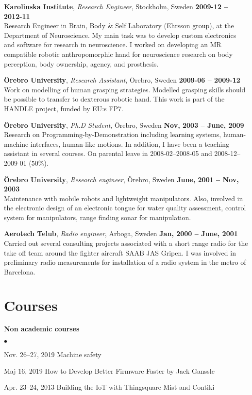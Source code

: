 \documentclass[a4paper,margin,line]{res} \usepackage{latexsym}
\newenvironment{list2}{
  \begin{list}{$\bullet$}{%
      \setlength{\itemsep}{0in} \setlength{\parsep}{0in}
      \setlength{\parskip}{0in} \setlength{\topsep}{0in}
      \setlength{\partopsep}{0in}
      \setlength{\leftmargin}{0.2in}}}{\end{list}}
\begin{document}
\begin{resume}

{\bf Karolinska Institute}, {\em Research Engineer}, Stockholm, Sweden
\hfill {\bf 2009-12 -- 2012-11}\\ Research Engineer in Brain, Body \&
Self Laboratory (Ehrsson group), at the Department of Neuroscience.
My main task was to develop custom electronics and software for
research in neuroscience.  I worked on developing an MR compatible
robotic anthropomorphic hand for neuroscience research on body
perception, body ownership, agency, and prosthesis.

{\bf \"Orebro University}, {\em Research Assistant}, \"Orebro, Sweden
\hfill {\bf 2009-06 -- 2009-12}\\ Work on modelling of human grasping
strategies. Modelled grasping skills should be possible to transfer to
dexterous robotic hand. This work is part of the HANDLE project,
funded by EU:s FP7.

{\bf \"Orebro University}, {\em Ph.D Student}, \"Orebro, Sweden \hfill
{\bf Nov, 2003 -- June, 2009}\\ Research on
Programming-by-Demonstration including learning systems, human-machine
interfaces, human-like motions.  In addition, I have been a teaching
assistant in several courses.  On parental leave in 2008-02--2008-05
and 2008-12--2009-01 (50\%).

{\bf \"Orebro University}, {\em Research engineer}, \"Orebro, Sweden
\hfill {\bf June, 2001 -- Nov, 2003}\\ Maintenance with mobile robots
and lightweight manipulators. Also, involved in the electronic design
of an electronic tongue for water quality assessment, control system
for manipulators, range finding sonar for manipulation.

{\bf Aerotech Telub}, {\em Radio engineer}, Arboga, Sweden \hfill {\bf
  Jan, 2000 -- June, 2001}\\ Carried out several consulting projects
associated with a short range radio for the take off team around the
fighter aircraft SAAB JAS Gripen.  I was involved in preliminary radio
measurements for installation of a radio system in the metro of
Barcelona.

\section{\sc Courses}
{\bf Non academic courses}\\
\begin{list2}
\item Nov. 26--27, 2019 Machine safety
\item Maj 16, 2019 How to Develop Better Firmware Faster by Jack Ganssle
  \item Apr. 23--24, 2013 Building the IoT with Thingsquare Mist and Contiki
\end{list2}



\end{resume}
\end{document}
